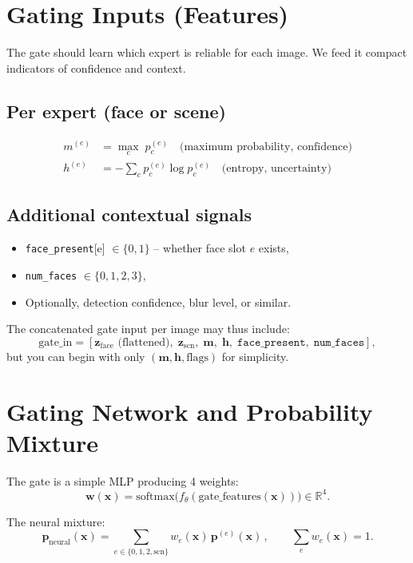 \documentclass[12pt]{article}
\begin{document}
\section{Gating Inputs (Features)}
The gate should learn which expert is reliable for each image. We feed it compact indicators of confidence and context.

\subsection*{Per expert (face or scene)}
\begin{align*}
m^{(e)} &= \max_{c}\;p^{(e)}_{c} \quad \text{(maximum probability, confidence)}\\
h^{(e)} &= -\sum_{c}p^{(e)}_{c}\log p^{(e)}_{c} \quad \text{(entropy, uncertainty)}
\end{align*}

\subsection*{Additional contextual signals}
\begin{itemize}[leftmargin=1.2em]
  \item \texttt{face\_present}[e] $\in \{0,1\}$ – whether face slot $e$ exists,
  \item \texttt{num\_faces} $\in \{0,1,2,3\}$,
  \item Optionally, detection confidence, blur level, or similar.
\end{itemize}

The concatenated gate input per image may thus include:
\[
\text{gate\_in} = [\bm{z}_{\text{face}}\text{ (flattened)},\; \bm{z}_{\text{scn}},\; \bm{m},\; \bm{h},\; \texttt{face\_present},\; \texttt{num\_faces}],
\]
but you can begin with only $(\bm{m},\bm{h},\text{flags})$ for simplicity.

\section{Gating Network and Probability Mixture}
The gate is a simple MLP producing 4 weights:
\[
\bm{w}(\bm{x})=\mathrm{softmax}\!\bigl(f_{\theta}(\text{gate\_features}(\bm{x}))\bigr) \in \mathbb{R}^{4}.
\]

The neural mixture:
\[
\bm{p}_{\text{neural}}(\bm{x}) = \sum_{e\in\{0,1,2,\text{scn}\}} w_e(\bm{x})\,\bm{p}^{(e)}(\bm{x})\,,
\qquad
\sum_{e} w_e(\bm{x})=1.
\]
\end{document}
